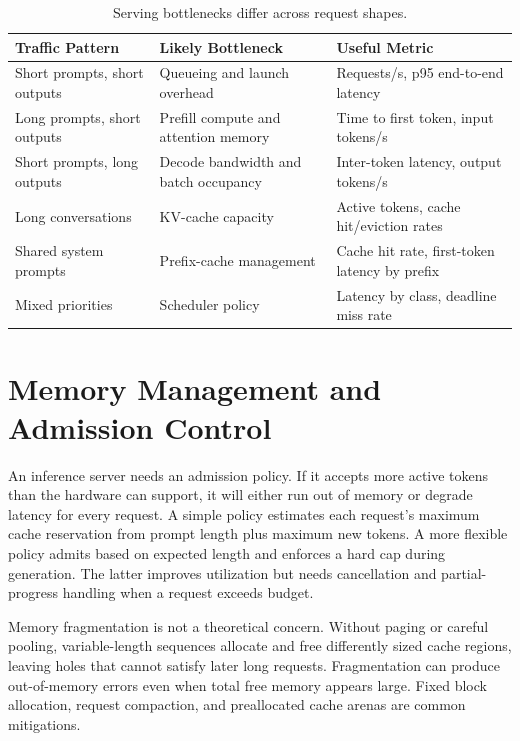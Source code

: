 \begin{table}[t]
\caption{Serving bottlenecks differ across request shapes.}
\label{tab:serving-bottlenecks}
\small
\begin{tabular}{@{}p{3.1cm}p{3.8cm}p{4.5cm}@{}}
\toprule
Traffic Pattern & Likely Bottleneck & Useful Metric \\
\midrule
Short prompts, short outputs & Queueing and launch overhead & Requests/s, p95 end-to-end latency \\
Long prompts, short outputs & Prefill compute and attention memory & Time to first token, input tokens/s \\
Short prompts, long outputs & Decode bandwidth and batch occupancy & Inter-token latency, output tokens/s \\
Long conversations & KV-cache capacity & Active tokens, cache hit/eviction rates \\
Shared system prompts & Prefix-cache management & Cache hit rate, first-token latency by prefix \\
Mixed priorities & Scheduler policy & Latency by class, deadline miss rate \\
\bottomrule
\end{tabular}
\end{table}

\section{Memory Management and Admission Control}
\label{sec:serving-memory-admission}

An inference server needs an admission policy. If it accepts more active tokens than the hardware can support, it will either run out of memory or degrade latency for every request. A simple policy estimates each request's maximum cache reservation from prompt length plus maximum new tokens. A more flexible policy admits based on expected length and enforces a hard cap during generation. The latter improves utilization but needs cancellation and partial-progress handling when a request exceeds budget.

Memory fragmentation is not a theoretical concern. Without paging or careful pooling, variable-length sequences allocate and free differently sized cache regions, leaving holes that cannot satisfy later long requests. Fragmentation can produce out-of-memory errors even when total free memory appears large. Fixed block allocation, request compaction, and preallocated cache arenas are common mitigations.

